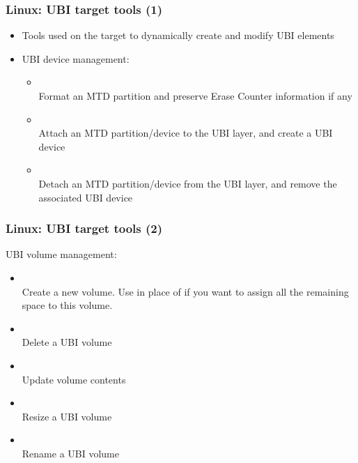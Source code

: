\begin{frame}
  \frametitle{Linux: UBI target tools (1)}
  \begin{itemize}
  \item Tools used on the target to dynamically create and modify
      UBI elements
  \item UBI device management:
    \begin{itemize}
    \item {}\\
	Format an MTD partition and preserve Erase Counter information if any
    \item {}\\
	Attach an MTD partition/device to the UBI layer, and create a UBI device
    \item {}\\
	Detach an MTD partition/device from the UBI layer, and remove
        the associated UBI device
    \end{itemize}
  \end{itemize}
\end{frame}

\begin{frame}
  \frametitle{Linux: UBI target tools (2)}
  UBI volume management:
    \begin{itemize}
    \item {\small {}}\\
	Create a new volume. Use  in place of 
	if you want to assign all the remaining space to this volume.
    \item {\small {}}\\
	Delete a UBI volume
    \item {\small {}}\\
	Update volume contents
    \item {\small {}}\\
      	Resize a UBI volume
    \item {\small {}}\\
	Rename a UBI volume
    \end{itemize}
\end{frame}

